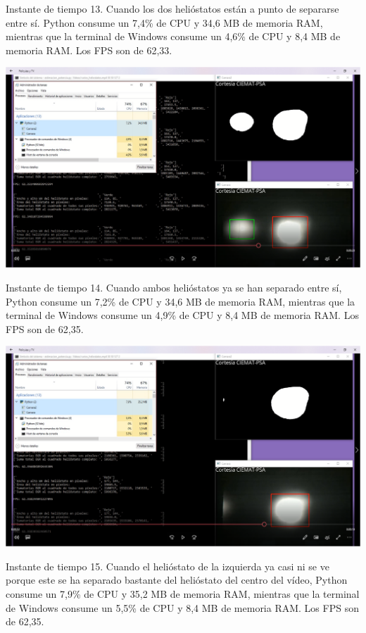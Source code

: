 \documentclass[12pt]{article}
\begin{document}
Instante de tiempo 13. Cuando los dos helióstatos están a punto de separarse entre sí. Python consume un 7,4\% de CPU y 34,6 MB de memoria RAM, mientras que la terminal de Windows consume un 4,6\% de CPU y 8,4 MB de memoria RAM. Los FPS son de 62,33.


\includegraphics[width=\textwidth]{CapturasRendimientoSoftware1/Imagen14.png}

Instante de tiempo 14. Cuando ambos helióstatos ya se han separado entre sí, Python consume un 7,2\% de CPU y 34,6 MB de memoria RAM, mientras que la terminal de Windows consume un 4,9\% de CPU y 8,4 MB de memoria RAM. Los FPS son de 62,35.


\includegraphics[width=\textwidth]{CapturasRendimientoSoftware1/Imagen15.png}

Instante de tiempo 15. Cuando el helióstato de la izquierda ya casi ni se ve porque este se ha separado bastante del helióstato del centro del vídeo, Python consume un 7,9\% de CPU y 35,2 MB de memoria RAM, mientras que la terminal de Windows consume un 5,5\% de CPU y 8,4 MB de memoria RAM. Los FPS son de 62,35.
\end{document}
